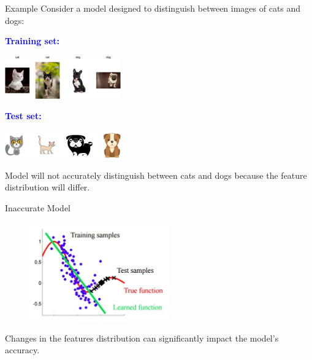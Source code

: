 \documentclass[11pt]{beamer}
\begin{document}
\begin{frame}{Example}
	Consider a model designed to distinguish between images of cats and dogs:
	
	\vspace{0.5cm}
	\begin{minipage}[t]{0.55\textwidth} %
		\begin{flushleft}
			\textbf{\textcolor{blue}{Training set:}}
		\end{flushleft}
		\centering
		\includegraphics[width=5cm]{../assets/cat-dog-train.png}
		\label{fig:cani-gatti}
		\vspace{-0.2cm}
		\begin{flushleft}
			\textbf{\textcolor{blue}{Test set:}}
		\end{flushleft}
		\centering
		\includegraphics[width=5cm]{../assets/cat-dog-test.png}
		\label{fig:cani-gatti}
		
	\end{minipage}
	\hfill
	\begin{minipage}[t]{0.35\textwidth} %
		\vspace{0.2cm}
		\begin{tcolorbox}[colframe=blue!50!black, colback=blue!5, coltitle=black, sharp corners]
			Model will not accurately distinguish between cats and dogs because the feature distribution will differ.
		\end{tcolorbox}
	\end{minipage}
\end{frame}

\begin{frame}{Inaccurate Model}
	\begin{figure}[H]
		\centering
		\includegraphics[width=6cm]{../assets/inacurate_model.png}
		\label{fig:inacurate_model}
	\end{figure}
	Changes in the features distribution can significantly impact the model's accuracy.
\end{frame}


 
\end{document}
